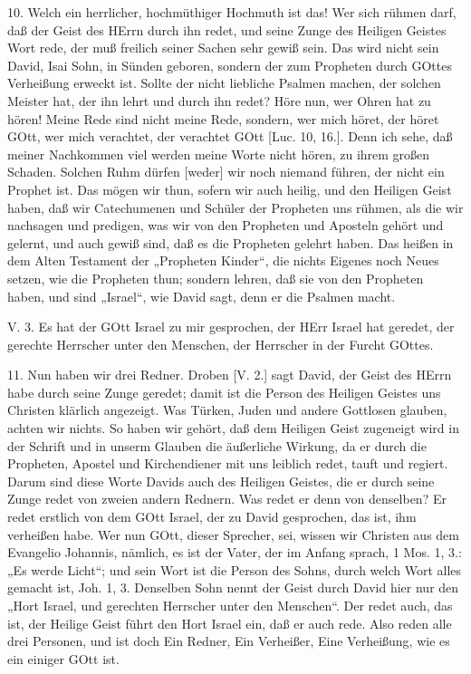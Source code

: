 10. Welch ein herrlicher, hochmüthiger Hochmuth ist das! Wer sich rühmen darf, daß der Geist des HErrn durch ihn redet, und seine Zunge des Heiligen Geistes Wort rede, der muß freilich seiner Sachen sehr gewiß sein. Das wird nicht sein David, Isai Sohn, in Sünden geboren, sondern der zum Propheten durch GOttes Verheißung erweckt ist. Sollte der nicht liebliche Psalmen machen, der solchen Meister hat, der ihn lehrt und durch ihn redet? Höre nun, wer Ohren hat zu hören! Meine Rede sind nicht meine Rede, sondern, wer mich höret, der höret GOtt, wer mich verachtet, der verachtet GOtt [Luc. 10, 16.]. Denn ich sehe, daß meiner Nachkommen viel werden meine Worte nicht hören, zu ihrem großen Schaden. Solchen Ruhm dürfen [weder] wir noch niemand führen, der nicht ein Prophet ist. Das mögen wir thun, sofern wir auch heilig, und den Heiligen Geist haben, daß wir Catechumenen und Schüler der Propheten uns rühmen, als die wir nachsagen und predigen, was wir von den Propheten und Aposteln gehört und gelernt, und auch gewiß sind, daß es die Propheten gelehrt haben. Das heißen in dem Alten Testament der „Propheten Kinder“, die nichts Eigenes noch Neues setzen, wie die Propheten thun; sondern lehren, daß sie von den Propheten haben, und sind „Israel“, wie David sagt, denn er die Psalmen macht.

\begin{schriftzitat}
V. 3. Es hat der GOtt Israel zu mir gesprochen, der HErr Israel hat geredet, der gerechte Herrscher unter den Menschen, der Herrscher in der Furcht GOttes.
\end{schriftzitat}

11. Nun haben wir drei Redner. Droben [V. 2.] sagt David, der Geist des HErrn habe durch seine Zunge geredet; damit ist die Person des Heiligen Geistes uns Christen klärlich angezeigt. Was Türken, Juden und andere Gottlosen glauben, achten wir nichts. So haben wir gehört, daß dem Heiligen Geist zugeneigt wird in der Schrift und in unserm Glauben die äußerliche Wirkung, da er durch die Propheten, Apostel und Kirchendiener mit uns leiblich redet, tauft und regiert. Darum sind diese Worte Davids auch des Heiligen Geistes, die er durch seine Zunge redet von zweien andern Rednern. Was redet er denn von denselben? Er redet erstlich von dem GOtt Israel, der zu David gesprochen, das ist, ihm verheißen habe. Wer nun GOtt, dieser Sprecher, sei, wissen wir Christen aus dem Evangelio Johannis, nämlich, es ist der Vater, der im Anfang sprach, 1 Mos. 1, 3.: „Es werde Licht“; und sein Wort ist die Person des Sohns, durch welch Wort alles gemacht ist, Joh. 1, 3. Denselben Sohn nennt der Geist durch David hier nur den „Hort Israel, und gerechten Herrscher unter den Menschen“. Der redet auch, das ist, der Heilige Geist führt den Hort Israel ein, daß er auch rede. Also reden alle drei Personen, und ist doch Ein Redner, Ein Verheißer, Eine Verheißung, wie es ein einiger GOtt ist.

